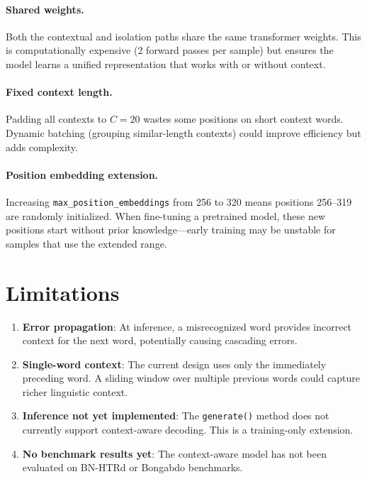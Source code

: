 \documentclass[11pt, a4paper]{report}
\begin{document}
\paragraph{Shared weights.} Both the contextual and isolation paths share the same transformer weights. This is computationally expensive (2 forward passes per sample) but ensures the model learns a unified representation that works with or without context.

\paragraph{Fixed context length.} Padding all contexts to $C{=}20$ wastes some positions on short context words. Dynamic batching (grouping similar-length contexts) could improve efficiency but adds complexity.

\paragraph{Position embedding extension.} Increasing \texttt{max\_position\_embeddings} from 256 to 320 means positions 256--319 are randomly initialized. When fine-tuning a pretrained model, these new positions start without prior knowledge---early training may be unstable for samples that use the extended range.

\section{Limitations}
\label{sec:limitations}

\begin{enumerate}[leftmargin=2em]
  \item \textbf{Error propagation}: At inference, a misrecognized word provides incorrect context for the next word, potentially causing cascading errors.
  \item \textbf{Single-word context}: The current design uses only the immediately preceding word. A sliding window over multiple previous words could capture richer linguistic context.
  \item \textbf{Inference not yet implemented}: The \texttt{generate()} method does not currently support context-aware decoding. This is a training-only extension.
  \item \textbf{No benchmark results yet}: The context-aware model has not been evaluated on BN-HTRd or Bongabdo benchmarks.
\end{enumerate}
\end{document}
